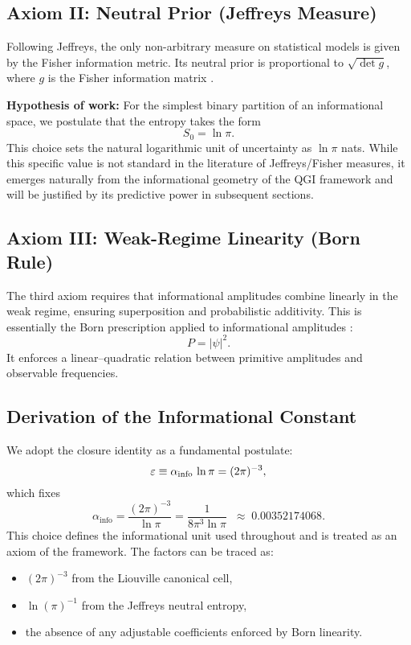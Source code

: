 \documentclass{article}
\numberwithin{equation}{section}
\theoremstyle{plain}
\theoremstyle{definition}
\theoremstyle{remark}
\newcommand{\ainfo}{\alpha_{\text{info}}}
\newcommand{\ainfoexact}{\frac{1}{8\pi^3\ln\pi}}
\newcommand{\ainfoapprox}{0.00352174068}
\begin{document}
\subsection{Axiom II: Neutral Prior (Jeffreys Measure)}
Following Jeffreys, the only non-arbitrary measure on statistical models is given by the Fisher information metric. Its neutral prior is proportional to $\sqrt{\det g}$, where $g$ is the Fisher information matrix \cite{Jeffreys1946}. 

\textbf{Hypothesis of work:} For the simplest binary partition of an informational space, we postulate that the entropy takes the form
\begin{equation}
S_0 = \ln\pi.
\end{equation}
This choice sets the natural logarithmic unit of uncertainty as $\ln\pi$ nats. While this specific value is not standard in the literature of Jeffreys/Fisher measures, it emerges naturally from the informational geometry of the QGI framework and will be justified by its predictive power in subsequent sections.

\subsection{Axiom III: Weak-Regime Linearity (Born Rule)}
The third axiom requires that informational amplitudes combine linearly in the weak regime, ensuring superposition and probabilistic additivity. This is essentially the Born prescription applied to informational amplitudes \cite{Born1926}:
\begin{equation}
P = |\psi|^2.
\end{equation}
It enforces a linear–quadratic relation between primitive amplitudes and observable frequencies.

\subsection{Derivation of the Informational Constant}
We adopt the closure identity as a fundamental postulate:
\begin{equation}
\varepsilon \equiv \alpha_{\rm info}\,\ln\pi = (2\pi)^{-3},
\end{equation}
which fixes
\begin{equation}
\ainfo = \frac{(2\pi)^{-3}}{\ln\pi} = \ainfoexact \;\;\approx\; \ainfoapprox.
\label{eq:ainfo_main}
\end{equation}
This choice defines the informational unit used throughout and is treated as an axiom of the framework. The factors can be traced as:
\begin{itemize}
    \item $(2\pi)^{-3}$ from the Liouville canonical cell,
    \item $\ln(\pi)^{-1}$ from the Jeffreys neutral entropy,
    \item the absence of any adjustable coefficients enforced by Born linearity.
\end{itemize}
\end{document}
